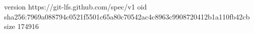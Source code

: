version https://git-lfs.github.com/spec/v1
oid sha256:7969a088794c0521f5501c65a80c70542ac4c8963c9908720412b1a110fb42cb
size 174916
